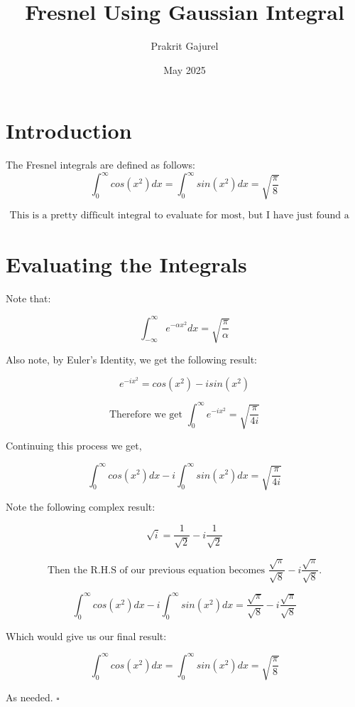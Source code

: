\documentclass{article}
\title{Fresnel Using Gaussian Integral}
\author{Prakrit Gajurel}
\date{May 2025}
\begin{document}
\maketitle

\section{Introduction}

The Fresnel integrals are defined as follows: \\
\[
\int_0^{\infty} cos(x^2) dx = \int_0^{\infty} sin(x^2) dx = \sqrt{\frac{\pi}{8}}
\]

\begin{align}
    \text{This is a pretty difficult integral to evaluate for most, but I have just found a way to evaluate it using the Gaussian integral, and I think it’s pretty cool.}
\end{align}

\section{Evaluating the Integrals}

Note that:

\[
\int_{-\infty}^{\infty} e^{-\alpha x^2}dx = \sqrt{\frac{\pi}{\alpha}}
\]

Also note, by Euler's Identity, we get the following result:

\[
e^{-ix^2} = cos(x^2) - isin(x^2)
\]

\[
\text{Therefore we get } \int_0^{\infty} e^{-ix^2} = \sqrt{\frac{\pi}{4i}}
\]

Continuing this process we get,

\[
\int_0^{\infty} cos(x^2) dx - i \int_0^{\infty} sin(x^2) dx = \sqrt{\frac{\pi}{4i}}
\]

Note the following complex result:

\[
\sqrt{i} = \frac{1}{\sqrt{2}} - i\frac{1}{\sqrt{2}}
\]

\[
\text{Then the R.H.S of our previous equation becomes } \frac{\sqrt{\pi}}{\sqrt{8}} - i\frac{\sqrt{\pi}}{\sqrt{8}}.
\]

\[
\int_0^{\infty} cos(x^2) dx - i \int_0^{\infty} sin(x^2) dx = \frac{\sqrt{\pi}}{\sqrt{8}} - i\frac{\sqrt{\pi}}{\sqrt{8}}
\]

Which would give us our final result:

\[
\boxed{\int_0^{\infty} cos(x^2) dx = \int_0^{\infty} sin(x^2) dx = \sqrt{\frac{\pi}{8}}}
\]

As needed. $\square$
\end{document}
